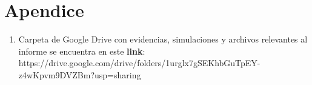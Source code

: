 \section{Apendice}

\begin{enumerate}
    \item Carpeta de Google Drive con evidencias, simulaciones y archivos relevantes al informe se encuentra en este \textbf{link}: https://drive.google.com/drive/folders/1urglx7gSEKhbGuTpEY-z4wKpvm9DVZBm?usp=sharing
\end{enumerate}